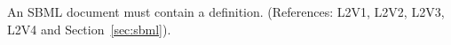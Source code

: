 An SBML document must contain a \Model definition.  (References:
L2V1, L2V2, L2V3, L2V4 and  Section~\ref{sec:sbml}).
